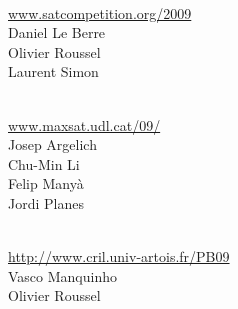 \documentclass[10pt]{article}
\newcommand{\bthlight}[1]{{\color[rgb]{0.2,0.2,0.5}#1}}
\begin{document}
\begin{minipage}[t]{9.25cm}
  \begin{minipage}[t]{9.25cm}
    \vspace*{0.35cm}
    \begin{minipage}[t]{4.5cm}
      \bthlight{{\bf SAT Competition}} \\
               {\small \url{www.satcompetition.org/2009}}\\[0.15cm]
               Daniel Le Berre\\
               Olivier Roussel\\
               Laurent Simon\\[0.15cm]
    \end{minipage}
    \hspace*{0.5cm}
    \begin{minipage}[t]{4.25cm}
      \bthlight{{\bf MAX-SAT Evaluation}}\\
               {\small \url{www.maxsat.udl.cat/09/}}\\[0.15cm]
               Josep Argelich\\
               Chu-Min Li\\
               Felip Many\`{a}\\
               Jordi Planes %
    \end{minipage}

    \begin{minipage}[t]{9.25cm}
      \vspace*{0.25cm}
      \begin{minipage}[t]{6.0cm}
        \bthlight{{\bf PB Evaluation}}\\
                 {\small \url{http://www.cril.univ-artois.fr/PB09}}\\[0.15cm]
                 Vasco Manquinho\\
                 Olivier Roussel %
      \end{minipage}
    \end{minipage}
  \end{minipage}


\end{minipage}
%
\end{document}
